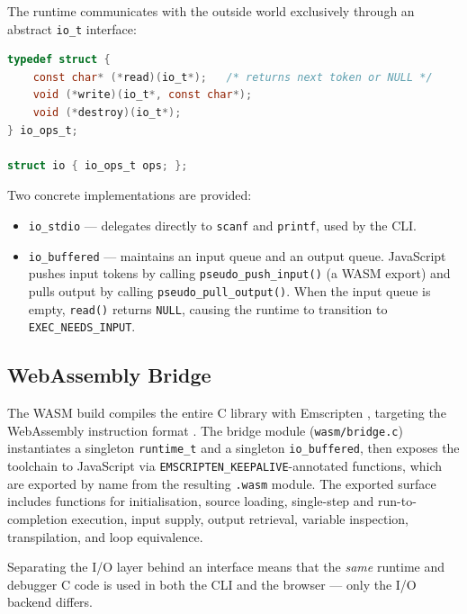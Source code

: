 The runtime communicates with the outside world exclusively through an abstract
\texttt{io\_t} interface:

\begin{lstlisting}[language=C, basicstyle=\ttfamily\small]
typedef struct {
    const char* (*read)(io_t*);   /* returns next token or NULL */
    void (*write)(io_t*, const char*);
    void (*destroy)(io_t*);
} io_ops_t;

struct io { io_ops_t ops; };
\end{lstlisting}

Two concrete implementations are provided:

\begin{itemize}
  \item \texttt{io\_stdio} --- delegates directly to \texttt{scanf} and
        \texttt{printf}, used by the CLI.
  \item \texttt{io\_buffered} --- maintains an input queue and an output
        queue.  JavaScript pushes input tokens by calling
        \texttt{pseudo\_push\_input()} (a WASM export) and pulls output by
        calling \texttt{pseudo\_pull\_output()}.  When the input queue is empty,
        \texttt{read()} returns \texttt{NULL}, causing the runtime to transition
        to \texttt{EXEC\_NEEDS\_INPUT}.
\end{itemize}

\subsection{WebAssembly Bridge}

The WASM build compiles the entire C library with Emscripten \cite{emscripten},
targeting the WebAssembly instruction format \cite{haas2017wasm}.  The bridge
module (\texttt{wasm/bridge.c}) instantiates a singleton \texttt{runtime\_t}
and a singleton \texttt{io\_buffered}, then exposes the toolchain to
JavaScript via \texttt{EMSCRIPTEN\_KEEPALIVE}-annotated functions, which are
exported by name from the resulting \texttt{.wasm} module.  The exported
surface includes functions for initialisation, source loading, single-step and
run-to-completion execution, input supply, output retrieval, variable
inspection, transpilation, and loop equivalence.

Separating the I/O layer behind an interface means that the \emph{same}
runtime and debugger C code is used in both the CLI and the browser --- only
the I/O backend differs.

